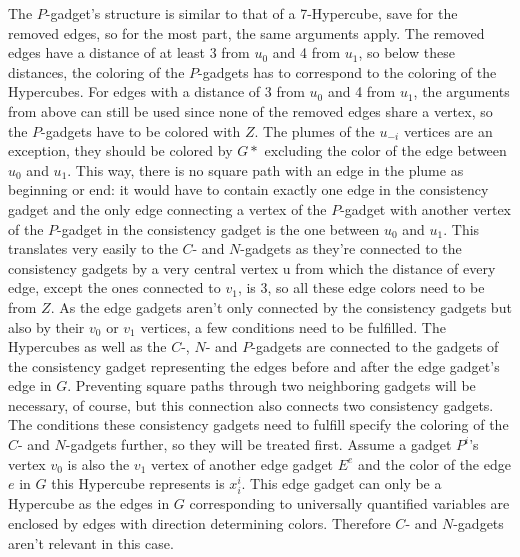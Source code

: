 \documentclass[12pt,a4paper]{article}
\begin{document}
\newline
The $P$-gadget's structure is similar to that of a 7-Hypercube, save for the removed edges, so for the most part, the same arguments apply. The removed edges have a distance of at least 3 from $u_0$ and 4 from $u_1$, so below these distances, the coloring of the $P$-gadgets has to correspond to the coloring of the Hypercubes. For edges with a distance of 3 from $u_0$ and 4 from $u_1$, the arguments from above can still be used since none of the removed edges share a vertex, so the $P$-gadgets have to be colored with $Z$. The plumes of the $u_{-i}$ vertices are an exception, they should be colored by $G*$ excluding the color of the edge between $u_0$ and $u_1$. This way, there is no square path with an edge in the plume as beginning or end: it would have to contain exactly one edge in the consistency gadget and the only edge connecting a vertex of the $P$-gadget with another vertex of the $P$-gadget in the consistency gadget is the one between $u_0$ and $u_1$. 
\newline
This translates very easily to the $C$- and $N$-gadgets as they're connected to the consistency gadgets by a very central vertex u from which the distance of every edge, except the ones connected to $v_1$, is 3, so all these edge colors need to be from $Z$.	
\newline
As the edge gadgets aren't only connected by the consistency gadgets but also by their $v_0$ or $v_1$ vertices, a few conditions need to be fulfilled. The Hypercubes as well as the $C$-, $N$- and $P$-gadgets are connected to the gadgets of the consistency gadget representing the edges before and after the edge gadget's edge in $G$. Preventing square paths through two neighboring gadgets will be necessary, of course, but this connection also connects two consistency gadgets. The conditions these consistency gadgets need to fulfill specify the coloring of the $C$- and $N$-gadgets further, so they will be treated first.
\newline
Assume a gadget $P^i$'s vertex $v_0$ is also the $v_1$ vertex of another edge gadget $E^e$ and the color of the edge $e$ in $G$ this Hypercube represents is $x^i_i$. This edge gadget can only be a Hypercube as the edges in $G$ corresponding to universally quantified variables are enclosed by edges with direction determining colors. Therefore $C$- and $N$-gadgets aren't relevant in this case. 
\newline
\end{document}
